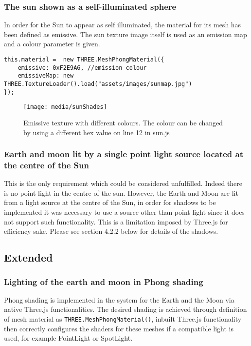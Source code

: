 \documentclass[titlepage]{article}
\begin{document}
\subsubsection{The sun shown as a self-illuminated sphere}
In order for the Sun to appear as self illuminated, the material for its mesh has been defined as emissive. The sun texture image itself is used as an emission map and a colour parameter is given. 
\begin{lstlisting}
this.material =  new THREE.MeshPhongMaterial({
    emissive: 0xF2E9A6, //emission colour
    emissiveMap: new THREE.TextureLoader().load("assets/images/sunmap.jpg")
});
\end{lstlisting}
\FloatBarrier
\begin{figure}[h!]
                \centering
                \texttt{[image: media/sunShades]}
                \caption{Emissive texture with different colours. The colour can be changed by using a different hex value on line 12 in sun.js}
\end{figure}
\FloatBarrier
\subsubsection{Earth and moon lit by a single point light source located at the centre of the Sun}
This is the only requirement which could be considered unfulfilled. Indeed there is no point light in the centre of the sun. However, the Earth and Moon are lit from a light source at the centre of the Sun, in order for shadows to be implemented it was necessary to use a source other than point light since it does not support such functionality. This is a limitation imposed by Three.js for efficiency sake. Please see section 4.2.2 below for details of the shadows.

\subsection{Extended}

\subsubsection{Lighting of the earth and moon in Phong shading}
Phong shading is implemented in the system for the Earth and the Moon via native Three.js functionalities. The desired shading is achieved through definition of mesh material as \texttt{THREE.MeshPhongMaterial()}, inbuilt Three.js functionality then correctly configures the shaders for these meshes if a compatible light is used, for example PointLight or SpotLight.
\end{document}
